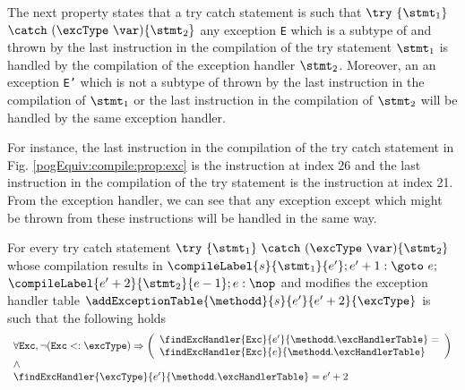 The next property states that a try catch statement is such that $ \try \ \{ \stmt_1 \} $ $ \catch \ (\excType \ \var )\{ \stmt_2 \}  $ 
any exception \texttt{E} which is a subtype of \excType{} and thrown by  the last instruction in the compilation of the try statement $ \stmt_1 $ is handled by the 
compilation of the exception handler $\stmt_2$. Moreover, an 
 an exception \texttt{E'} which is not a subtype of \excType{} thrown by the  last instruction in the compilation of $\stmt_1$
or the last instruction  in the compilation of $\stmt_2$ will be handled by the same exception handler. 

For instance, the last instruction in the compilation of the try catch statement  in Fig. \ref{pogEquiv:compile:prop:exc} 
is the instruction at index 26 and the last instruction in the compilation of the try statement is the instruction at index 21. 
From the exception handler, we can see that any exception except \NullPointerExc{} which might be thrown from these instructions 
will be handled in the same way. 
 
\begin{compProp}\label{compile:prop:compProp10}
For every try catch statement $ \try \ \{ \stmt_1 \} \ \catch \ (\excType \ \var )\{ \stmt_2 \}  $ 
whose compilation  results in 
$ \compileLabel{s}{\stmt_1}{e'}; e' + 1: \goto \ e;  $ $\compileLabel{e' + 2 }{\stmt_2}{e - 1}; e: \nop$
and modifies the exception handler table  
	$\addExceptionTable{\methodd}{ s }{ e'  }{ e' + 2 }{\excType} $
is such that the following holds 
$$\begin{array}{l} \forall \mbox{\rm{\texttt{Exc}}},  \neg ( \mbox{\rm{\texttt{Exc}}} <: \excType ) \Rightarrow
  \left( \begin{array}{l}  
         \findExcHandler{\mbox{\rm\tt{Exc}} }{e'}{\methodd.\excHandlerTable} =\\ 
    \findExcHandler{\mbox{\rm\tt{Exc}} }{e}{\methodd.\excHandlerTable}  \\
   \end{array}\right) \\
   \wedge\\
  \findExcHandler{\excType }{e'}{\methodd.\excHandlerTable} = e'+2 \\ 
 \end{array} $$

\end{compProp}

